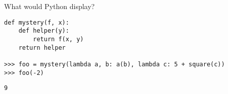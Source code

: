\begin{blocksection}
\question What would Python display?

\begin{lstlisting}
def mystery(f, x):
    def helper(y):
        return f(x, y)
    return helper

>>> foo = mystery(lambda a, b: a(b), lambda c: 5 + square(c))
>>> foo(-2)
\end{lstlisting}

\vspace{3cm}

\begin{solution}
\begin{lstlisting}
9
\end{lstlisting}
\end{solution}
\end{blocksection}

